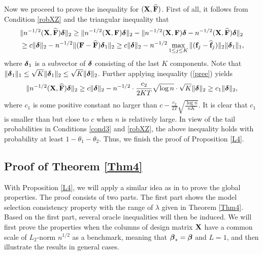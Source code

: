\documentclass{statsoc}
\newcommand{\bff}{\mbox{\bf f}}
\newcommand{\bF}{\mbox{\bf F}}
\newcommand{\bX}{\mbox{\bf X}}
\newcommand{\bbeta}{\mbox{\boldmath $\beta$}}
\newcommand{\bdelta}{\mbox{\boldmath $\delta$}}
\begin{document}
Now we proceed to prove the inequality for $(\bX, \widehat{\bF})$. First of all, it follows from Condition \ref{robXZ} and the triangular inequality that
\begin{align*}
&\|n^{-1/2}(\bX, \widehat{\bF}) \bdelta\|_2 \geq \|n^{-1/2}(\bX, \bF) \bdelta\|_2 - \|n^{-1/2}(\bX, \bF) \bdelta - n^{-1/2}(\bX, \widehat{\bF}) \bdelta\|_2\\
&\geq  c \|\bdelta\|_2 - n^{-1/2}\|(\bF - \widehat{\bF}) \bdelta_1\|_2 \geq c \|\bdelta\|_2 - n^{-1/2} \max_{1 \leq j \leq K} \|(\bff_j - \widehat{\bff}_j)\|_2 \|\bdelta_1\|_1,
\end{align*}
where $\bdelta_1$ is a subvector of $\bdelta$ consisting of the last $K$ components. Note that $\|\bdelta_1\|_1 \leq \sqrt{K} \|\bdelta_1\|_2 \leq \sqrt{K} \|\bdelta\|_2$. Further applying inequality (\ref{pree}) yields
\[\|n^{-1/2}(\bX, \widehat{\bF}) \bdelta\|_2 \geq c \|\bdelta\|_2 - n^{-1/2} \cdot \frac{c_2}{2K T}\sqrt{\log n} \cdot \sqrt{K}\|\bdelta\|_2 \geq c_1 \|\bdelta\|_2,\]
where $c_1$ is some positive constant no larger than $c - \frac{c_2}{2 T} \sqrt{\frac{\log n}{n K}}$. It is clear that $c_1$ is smaller than but close to $c$ when $n$ is relatively large. In view of the tail probabilities in Conditions \ref{cond3} and \ref{robXZ}, the above inequality holds with probability at least $1 - \theta_1 - \theta_2$. Thus, we finish the proof of Proposition \ref{L4}.



\subsection{Proof of Theorem \ref{Thm4}}

\smallskip

With Proposition \ref{L4}, we will apply a similar idea as in \cite{Zheng2014} to prove the global properties. The proof consists of two parts. The first part shows the model selection consistency property with the range of $\lambda$ given in Theorem \ref{Thm4}. Based on the first part, several oracle inequalities will then be induced. We will first prove the properties when the columns of design matrix $\bX$ have a common scale of $L_2$-norm $n^{1/2}$ as a benchmark, meaning that $\bbeta_{\ast} = \bbeta$ and $L = 1$, and then illustrate the results in general cases.
\end{document}
